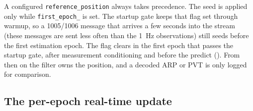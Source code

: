 \documentclass[main.tex]{subfiles}
\begin{document}
A configured \texttt{reference\_position} always takes precedence.  The
seed is applied only while \texttt{first\_epoch\_} is set.  The startup
gate keeps that flag set through warmup, so a 1005/1006 message that
arrives a few seconds into the stream (these messages are sent less
often than the \SI{1}{\hertz} observations) still seeds before the first
estimation epoch.  The flag clears in the first epoch that passes the
startup gate, after measurement conditioning and before the predict
().  From then on the filter owns the position, and a
decoded ARP or PVT is only logged for comparison.

\subsection{The per-epoch real-time update}\label{sec:rt-epoch}
\end{document}
